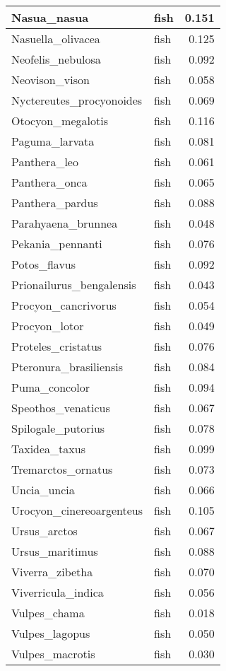 \begin{table}
\begin{tabular}[t]{l|l|r}
\hline
Nasua\_nasua & fish & 0.151\\
\hline
Nasuella\_olivacea & fish & 0.125\\
\hline
Neofelis\_nebulosa & fish & 0.092\\
\hline
Neovison\_vison & fish & 0.058\\
\hline
Nyctereutes\_procyonoides & fish & 0.069\\
\hline
Otocyon\_megalotis & fish & 0.116\\
\hline
Paguma\_larvata & fish & 0.081\\
\hline
Panthera\_leo & fish & 0.061\\
\hline
Panthera\_onca & fish & 0.065\\
\hline
Panthera\_pardus & fish & 0.088\\
\hline
Parahyaena\_brunnea & fish & 0.048\\
\hline
Pekania\_pennanti & fish & 0.076\\
\hline
Potos\_flavus & fish & 0.092\\
\hline
Prionailurus\_bengalensis & fish & 0.043\\
\hline
Procyon\_cancrivorus & fish & 0.054\\
\hline
Procyon\_lotor & fish & 0.049\\
\hline
Proteles\_cristatus & fish & 0.076\\
\hline
Pteronura\_brasiliensis & fish & 0.084\\
\hline
Puma\_concolor & fish & 0.094\\
\hline
Speothos\_venaticus & fish & 0.067\\
\hline
Spilogale\_putorius & fish & 0.078\\
\hline
Taxidea\_taxus & fish & 0.099\\
\hline
Tremarctos\_ornatus & fish & 0.073\\
\hline
Uncia\_uncia & fish & 0.066\\
\hline
Urocyon\_cinereoargenteus & fish & 0.105\\
\hline
Ursus\_arctos & fish & 0.067\\
\hline
Ursus\_maritimus & fish & 0.088\\
\hline
Viverra\_zibetha & fish & 0.070\\
\hline
Viverricula\_indica & fish & 0.056\\
\hline
Vulpes\_chama & fish & 0.018\\
\hline
Vulpes\_lagopus & fish & 0.050\\
\hline
Vulpes\_macrotis & fish & 0.030\\

\end{tabular}
\end{table}
